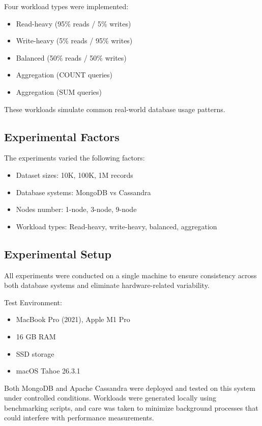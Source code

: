 \documentclass[12pt]{article}
\begin{document}
Four workload types were implemented:

\begin{itemize}
\item Read-heavy (95\% reads / 5\% writes)
\item Write-heavy (5\% reads / 95\% writes)
\item Balanced (50\% reads / 50\% writes)
\item Aggregation (COUNT queries)
\item Aggregation (SUM queries)
\end{itemize}

These workloads simulate common real-world database usage patterns.

\subsection{Experimental Factors}

The experiments varied the following factors:

\begin{itemize}
\item Dataset sizes: 10K, 100K, 1M records
\item Database systems: MongoDB vs Cassandra
\item Nodes number: 1-node, 3-node, 9-node
\item Workload types: Read-heavy, write-heavy, balanced, aggregation
\end{itemize}

\subsection{Experimental Setup}

All experiments were conducted on a single machine to ensure consistency across both database systems and eliminate hardware-related variability.

Test Environment:

\begin{itemize}
\item MacBook Pro (2021), Apple M1 Pro
\item 16 GB RAM
\item SSD storage
\item macOS Tahoe 26.3.1
\end{itemize}

Both MongoDB and Apache Cassandra were deployed and tested on this system under controlled conditions. Workloads were generated locally using benchmarking scripts, and care was taken to minimize background processes that could interfere with performance measurements.
\end{document}
